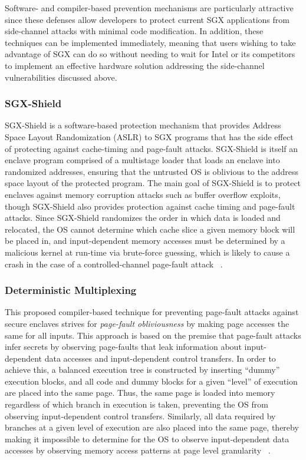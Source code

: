 Software- and compiler-based prevention mechanisms are particularly attractive since these defenses allow developers to protect current SGX applications from side-channel attacks with minimal code modification. In addition, these techniques can be implemented immediately, meaning that users wishing to take advantage of SGX can do so without needing to wait for Intel or its competitors to implement an effective hardware solution addressing the side-channel vulnerabilities discussed above.

\subsubsection{SGX-Shield}

SGX-Shield is a software-based protection mechanism that provides Address Space Layout Randomization (ASLR) to SGX programs that has the side effect of protecting against cache-timing and page-fault attacks. SGX-Shield is itself an enclave program comprised of a multistage loader that loads an enclave into randomized addresses, ensuring that the untrusted OS is oblivious to the address space layout of the protected program. The main goal of SGX-Shield is to protect enclaves against memory corruption attacks such as buffer overflow exploits, though SGX-Shield also provides protection against cache timing and page-fault attacks. Since SGX-Shield randomizes the order in which data is loaded and relocated, the OS cannot determine which cache slice a given memory block will be placed in, and input-dependent memory accesses must be determined by a malicious kernel at run-time via brute-force guessing, which is likely to cause a crash in the case of a controlled-channel page-fault attack ~\cite{seo_sgx-shield:_2017}. 

\subsubsection{Deterministic Multiplexing}

This proposed compiler-based technique for preventing page-fault attacks against secure enclaves strives for \emph{page-fault obliviousness} by making page accesses the same for all inputs. This approach is based on the premise that page-fault attacks infer secrets by observing page-faults that leak information about input-dependent data accesses and input-dependent control transfers. In order to achieve this, a balanced execution tree is constructed by inserting ``dummy'' execution blocks, and all code and dummy blocks for a given ``level'' of execution are placed into the same page. Thus, the same page is loaded into memory regardless of which branch in execution is taken, preventing the OS from observing input-dependent control transfers. Similarly, all data required by branches at a given level of execution are also placed into the same page, thereby making it impossible to determine for the OS to observe input-dependent data accesses by observing memory access patterns at page level granularity ~\cite{shinde_preventing_2015}. 

